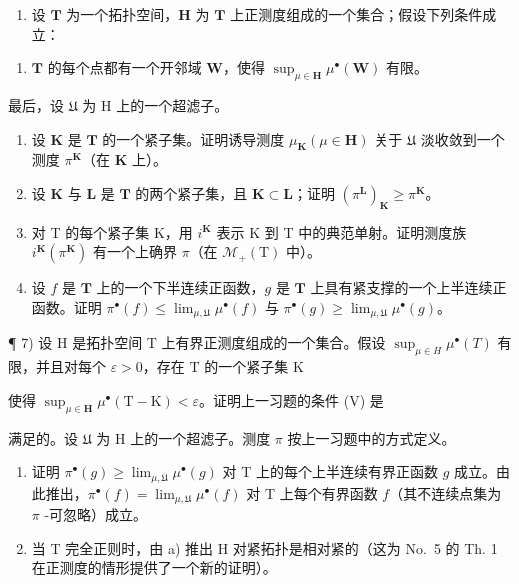 \begin{enumerate}
\def\labelenumi{\arabic{enumi})}
\setcounter{enumi}{5}
\tightlist
\item
  设 \(\mathbf{T}\) 为一个拓扑空间，\(\mathbf{H}\) 为 \(\mathbf{T}\) 上正测度组成的一个集合；假设下列条件成立：
\end{enumerate}

\begin{enumerate}
\def\labelenumi{(\Alph{enumi})}
\setcounter{enumi}{21}
\tightlist
\item
  \(\mathbf{T}\) 的每个点都有一个开邻域 \(\mathbf{W}\)，使得 \(\sup_{\mu \in \mathbf{H}} \mu^{\bullet}(\mathbf{W})\) 有限。
\end{enumerate}

最后，设 \(\mathfrak{U}\) 为 H 上的一个超滤子。

\begin{enumerate}
\def\labelenumi{\alph{enumi})}
\item
  设 \(\mathbf{K}\) 是 \(\mathbf{T}\) 的一个紧子集。证明诱导测度 \(\mu_{\mathbf{K}} (\mu \in \mathbf{H})\) 关于 \(\mathfrak{U}\) 淡收敛到一个测度 \(\pi^{\mathbf{K}}\)（在 \(\mathbf{K}\) 上）。
\item
  设 \(\mathbf{K}\) 与 \(\mathbf{L}\) 是 \(\mathbf{T}\) 的两个紧子集，且 \(\mathbf{K} \subset \mathbf{L}\)；证明 \((\pi^{\mathbf{L}})_{\mathbf{K}} \geqslant \pi^{\mathbf{K}}\)。
\item
  对 T 的每个紧子集 K，用 \(i^{\mathbf{K}}\) 表示 K 到 T 中的典范单射。证明测度族 \(i^{\mathbf{K}}(\pi^{\mathbf{K}})\) 有一个上确界 \(\pi\)（在 \(\mathcal{M}_{+}(\mathrm{T})\) 中）。
\item
  设 \(f\) 是 \(\mathbf{T}\) 上的一个下半连续正函数，\(g\) 是 \(\mathbf{T}\) 上具有紧支撑的一个上半连续正函数。证明 \(\pi^{\bullet}(f) \leqslant \lim_{\mu, \mathfrak{U}} \mu^{\bullet}(f)\) 与 \(\pi^{\bullet}(g) \geqslant \lim_{\mu, \mathfrak{U}} \mu^{\bullet}(g)\)。
\end{enumerate}

¶ 7) 设 H 是拓扑空间 T 上有界正测度组成的一个集合。假设 \(\sup_{\mu\in H}\mu^{\bullet}(T)\) 有限，并且对每个 \(\varepsilon>0\)，存在 T 的一个紧子集 K

使得 \(\sup_{\mu \in \mathbf{H}}\mu^{\bullet}(\mathrm{T} - \mathrm{K}) < \varepsilon\)。证明上一习题的条件 (V) 是

满足的。设 \(\mathfrak{U}\) 为 H 上的一个超滤子。测度 \(\pi\) 按上一习题中的方式定义。

\begin{enumerate}
\def\labelenumi{\alph{enumi})}
\item
  证明 \(\pi^{\bullet}(g) \geqslant \lim_{\mu, \mathfrak{U}} \mu^{\bullet}(g)\) 对 T 上的每个上半连续有界正函数 \(g\) 成立。由此推出，\(\pi^{\bullet}(f) = \lim_{\mu, \mathfrak{U}} \mu^{\bullet}(f)\) 对 T 上每个有界函数 \(f\)（其不连续点集为 \(\pi\) -可忽略）成立。
\item
  当 T 完全正则时，由 a) 推出 H 对紧拓扑是相对紧的（这为 No.~5 的 Th. 1 在正测度的情形提供了一个新的证明）。
\end{enumerate}

